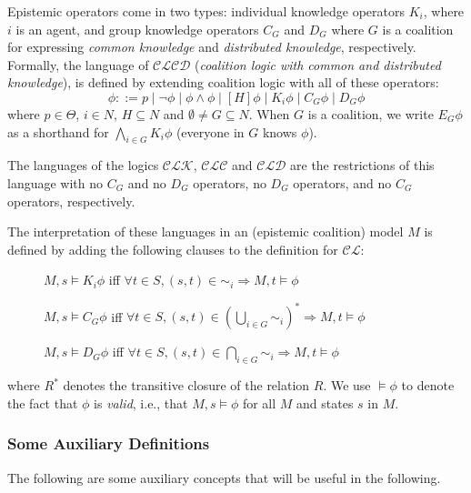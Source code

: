 \documentclass{article}
\newcommand{\acro}[1]{\ensuremath{\mathcal{#1}}}
\newcommand{\agents}{N}
\begin{document}
Epistemic operators come in two types: individual knowledge operators
$K_i$, where $i$ is an agent, and group knowledge operators $C_G$ and
$D_G$ where $G$ is a coalition for expressing \emph{common knowledge}
and \emph{distributed knowledge}, respectively. Formally, the language
of \acro{CLCD} (\emph{coalition logic with common and distributed
  knowledge}), is defined by extending coalition logic with all of
these operators:
\[\phi ::= p \mid \neg \phi \mid \phi \wedge \phi \mid [H]\phi\mid K_i \phi \mid C_G \phi \mid D_G \phi\]
where $p \in \Theta$, $i \in \agents$, $H \subseteq \agents$ and
$\emptyset \neq G \subseteq \agents$. When $G$ is a coalition, we
write $E_G \phi$ as a shorthand for $\bigwedge_{i \in G} K_i \phi$
(everyone in $G$ knows $\phi$).

The languages of the logics \acro{CLK}, \acro{CLC} and \acro{CLD} are
the restrictions of this language with no $C_G$ and no $D_G$
operators, no $D_G$ operators, and no $C_G$ operators, respectively.

The interpretation of these languages in an (epistemic coalition)
model $M$ is defined by adding the following clauses to the definition
for \acro{CL}:
\begin{description}
\item[] $M,s \models K_i \phi$ iff $\forall t \in S, (s,t) \in \sim_i \Rightarrow M,t \models \phi$
\item[] $M,s \models C_G \phi$ iff $\forall t \in S, (s,t) \in (\bigcup_{i \in
    G} \sim_i)^* \Rightarrow M,t \models \phi$
\item[] $M,s \models D_G \phi$ iff $\forall t \in S, (s,t) \in \bigcap_{i \in G} \sim_i \Rightarrow M,t \models \phi$
\end{description}
where $R^*$ denotes the transitive closure of the relation $R$.  We
use $\models \phi$ to denote the fact that $\phi$ is \emph{valid},
i.e., that $M,s \models \phi$ for all $M$ and states $s$ in $M$.

\subsubsection{Some Auxiliary Definitions}

The following are some auxiliary concepts that will be useful in the
following.
\end{document}
